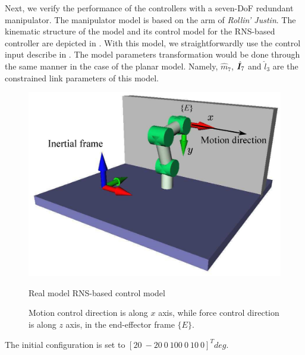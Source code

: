 %
Next, we verify the performance of the controllers with a seven-DoF redundant manipulator.
The manipulator model is based on the arm of \textit{Rollin' Justin}.
The kinematic structure of the model and its control model for the RNS-based controller are
depicted in .
With this model, we straightforwardly use the control input describe in .
The model parameters transformation would be done through the same manner in the case of the planar model.
Namely, $\hat{m}_{7}$, ${\hat{\bm{I}}}_{7}$ and $\hat{l}_{3}$ are the constrained link parameters of this model.

%
\begin{figure}[t]
  \centering
  \begin{minipage}[h]{1.0\linewidth}
    \centering
    \includegraphics[width=1.0\linewidth]{fig/chapter6/results/spatial/10000.eps}
  \end{minipage}
  \hspace{5em}
  \footnotesize\par{\hspace{2em} Real model \hspace{8em} RNS-based control model}
  \caption{Motion control direction is along $x$ axis,
    while force control direction is along $z$ axis,  in the end-effector frame $\{E\}$.}
  \label{fig:MODEL_JUSTIN_SIM}
\end{figure}
%
The initial configuration is set to $[20~-20~0~100~0~10~0]^{T}\unit{deg}$.
